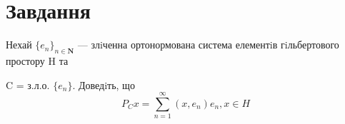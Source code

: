 
\chapter{Завдання \theHchapter}


\begin{tcolorbox}[title=Завдання]
    Нехай $\{e_n\}_{n \in \mathbf{N}} $ — злiченна ортонормована система елементiв 
    гiльбертового простору H та
    
    
    C = з.л.о. $\{e_n\}$. Доведiть, що
    $$ P_Cx = \sum_{n = 1}^{\infty}(x, e_n)e_n, x \in H $$
\end{tcolorbox}



